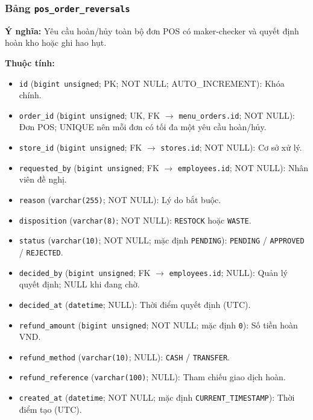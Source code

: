 \subsubsection{Bảng \texttt{pos\_order\_reversals}}

\textbf{Ý nghĩa:} Yêu cầu hoàn/hủy toàn bộ đơn POS có maker-checker và quyết định hoàn kho hoặc ghi hao hụt.\par

\textbf{Thuộc tính:}

\begin{itemize}

\item \texttt{id} (\texttt{bigint unsigned}; PK; NOT NULL; AUTO_INCREMENT): Khóa chính.

\item \texttt{order\_id} (\texttt{bigint unsigned}; UK, FK $\rightarrow$ \texttt{menu\_orders.id}; NOT NULL): Đơn POS; UNIQUE nên mỗi đơn có tối đa một yêu cầu hoàn/hủy.

\item \texttt{store\_id} (\texttt{bigint unsigned}; FK $\rightarrow$ \texttt{stores.id}; NOT NULL): Cơ sở xử lý.

\item \texttt{requested\_by} (\texttt{bigint unsigned}; FK $\rightarrow$ \texttt{employees.id}; NOT NULL): Nhân viên đề nghị.

\item \texttt{reason} (\texttt{varchar(255)}; NOT NULL): Lý do bắt buộc.

\item \texttt{disposition} (\texttt{varchar(8)}; NOT NULL): \texttt{RESTOCK} hoặc \texttt{WASTE}.

\item \texttt{status} (\texttt{varchar(10)}; NOT NULL; mặc định \texttt{PENDING}): \texttt{PENDING} / \texttt{APPROVED} / \texttt{REJECTED}.

\item \texttt{decided\_by} (\texttt{bigint unsigned}; FK $\rightarrow$ \texttt{employees.id}; NULL): Quản lý quyết định; NULL khi đang chờ.

\item \texttt{decided\_at} (\texttt{datetime}; NULL): Thời điểm quyết định (UTC).

\item \texttt{refund\_amount} (\texttt{bigint unsigned}; NOT NULL; mặc định \texttt{0}): Số tiền hoàn VND.

\item \texttt{refund\_method} (\texttt{varchar(10)}; NULL): \texttt{CASH} / \texttt{TRANSFER}.

\item \texttt{refund\_reference} (\texttt{varchar(100)}; NULL): Tham chiếu giao dịch hoàn.

\item \texttt{created\_at} (\texttt{datetime}; NOT NULL; mặc định \texttt{CURRENT\_TIMESTAMP}): Thời điểm tạo (UTC).

\end{itemize}

